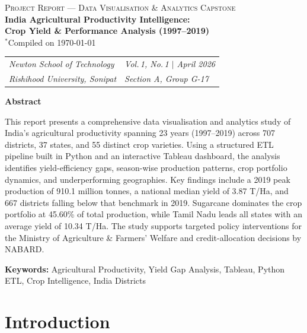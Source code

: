 \documentclass[10pt]{article}
\renewenvironment{abstract}
  {\small\begin{mdframed}[backgroundcolor=lightgreen, linecolor=darkgreen,
     linewidth=0.8pt, innerleftmargin=8pt, innerrightmargin=8pt,
     innertopmargin=6pt, innerbottommargin=6pt]
   \noindent\textbf{Abstract}\par\smallskip}
  {\end{mdframed}}
\begin{document}
\begin{center}
  {\footnotesize\scshape Project Report — Data Visualisation \& Analytics Capstone}\\[4pt]
  {\LARGE\bfseries India Agricultural Productivity Intelligence:\\[2pt]
   Crop Yield \& Performance Analysis (1997–2019)}\\[6pt]
  {\small $^*$Compiled on \today}\\[6pt]
  \begin{tabular}{ll}
    \textit{Newton School of Technology} & \textit{Vol.\,1, No.\,1 $|$ April 2026}\\
    \textit{Rishihood University, Sonipat} & \textit{Section A, Group G-17}\\
  \end{tabular}
\end{center}
\vspace{2pt}
\begin{abstract}
  This report presents a comprehensive data visualisation and analytics study of
  India's agricultural productivity spanning 23 years (1997–2019) across 707 districts,
  37 states, and 55 distinct crop varieties. Using a structured ETL pipeline built in
  Python and an interactive Tableau dashboard, the analysis identifies yield-efficiency
  gaps, season-wise production patterns, crop portfolio dynamics, and underperforming
  geographies. Key findings include a 2019 peak production of 910.1 million tonnes,
  a national median yield of 3.87 T/Ha, and 667 districts falling below that benchmark
  in 2019. Sugarcane dominates the crop portfolio at 45.60\% of total production,
  while Tamil Nadu leads all states with an average yield of 10.34 T/Ha.
  The study supports targeted policy interventions for the Ministry of Agriculture
  \& Farmers' Welfare and credit-allocation decisions by NABARD.

  \smallskip
  \noindent\textbf{Keywords:} Agricultural Productivity, Yield Gap Analysis, Tableau,
  Python ETL, Crop Intelligence, India Districts
\end{abstract}
\vspace{6pt}

\section{Introduction}
\end{document}
